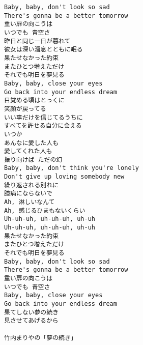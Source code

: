 \documentclass[10pt, landscape, twocolumn, a4paper, notitlepage]{article}
\begin{document}
\newpage
\begin{verbatim}
Baby, baby, don't look so sad
There's gonna be a better tomorrow
重い扉の向こうは
いつでも 青空さ
昨日と同じ一日が暮れて
彼女は深い溜息とともに眠る
果たせなかった約束
またひとつ増えただけ
それでも明日を夢見る
Baby, baby, close your eyes
Go back into your endless dream
目覚める頃はとっくに
笑顔が戻ってる
いい事だけを信じてるうちに
すべてを許せる自分に会える
いつか
あんなに愛した人も
愛してくれた人も
振り向けば ただの幻
Baby, baby, don't think you're lonely
Don't give up loving somebody new
繰り返される別れに
臆病にならないで
Ah, 淋しいなんて
Ah, 感じるひまもないくらい
Uh-uh-uh, uh-uh-uh, uh-uh
Uh-uh-uh, uh-uh-uh, uh-uh
果たせなかった約束
またひとつ増えただけ
それでも明日を夢見る
Baby, baby, don't look so sad
There's gonna be a better tomorrow
重い扉の向こうは
いつでも 青空さ
Baby, baby, close your eyes
Go back into your endless dream
果てしない夢の続き
見させてあげるから

竹内まりやの「夢の続き」
\end{verbatim}
\end{document}
